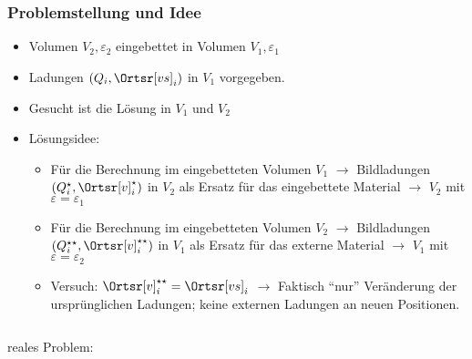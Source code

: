 \begin{frame}
  \frametitle{Problemstellung und Idee}
  \begin{itemize}[<+->]
  \item Volumen $V_2, \varepsilon_2$ eingebettet in Volumen $V_1,\varepsilon_1$
  \item Ladungen $(Q_i, \Ortsr[vs]_i)$ in $V_1$ vorgegeben.
  \item Gesucht ist die Lösung in $V_1$ \alert{und} $V_2$
  \item Lösungsidee:
    \begin{itemize}[<+->]
    \item Für die Berechnung im eingebetteten Volumen $V_1$ $\to$ Bildladungen $(Q_i^\star, \Ortsr[v]_i^\star)$ in $V_2$ als Ersatz für das eingebettete Material $\to$ $V_2$ mit $\varepsilon = \varepsilon_1$
    \item Für die Berechnung im eingebetteten Volumen $V_2$ $\to$ Bildladungen $(Q_i^{\star\star}, \Ortsr[v]_i^{\star\star})$ in $V_1$ als Ersatz für das externe Material $\to$ $V_1$ mit $\varepsilon = \varepsilon_2$
      \item Versuch: $\Ortsr[v]_i^{\star\star} = \Ortsr[vs]_i$ $\to$ Faktisch \enquote{nur} Veränderung der ursprünglichen Ladungen; keine externen Ladungen an neuen Positionen.
      \end{itemize}
    \end{itemize}
    \pause
    \begin{columns}
      \begin{column}{.3\textwidth}
      reales Problem:

      
        

\end{column}
\end{columns}
\end{frame}

